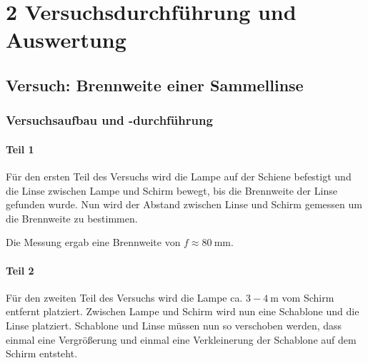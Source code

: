 \chapter*{2 Versuchsdurchführung und Auswertung}
\setcounter{chapter}{2}
\setcounter{section}{0}
\setcounter{subsection}{0}

\section{Versuch: Brennweite einer Sammellinse}

    \subsection{Versuchsaufbau und -durchführung}


        \subsubsection{Teil 1}
        
            Für den ersten Teil des Versuchs wird die Lampe auf der Schiene befestigt und die Linse zwischen Lampe und Schirm bewegt, bis die Brennweite der Linse gefunden wurde. Nun wird der Abstand zwischen Linse und Schirm gemessen um die Brennweite zu bestimmen.

            Die Messung ergab eine Brennweite von $f \approx 80\ \mathrm{mm}$.

        \subsubsection{Teil 2}
        
            Für den zweiten Teil des Versuchs wird die Lampe ca. $3 - 4\ \mathrm{m}$ vom Schirm entfernt platziert. Zwischen Lampe und Schirm wird nun eine Schablone und die Linse platziert. Schablone und Linse müssen nun so verschoben werden, dass einmal eine Vergrößerung und einmal eine Verkleinerung der Schablone auf dem Schirm entsteht.

